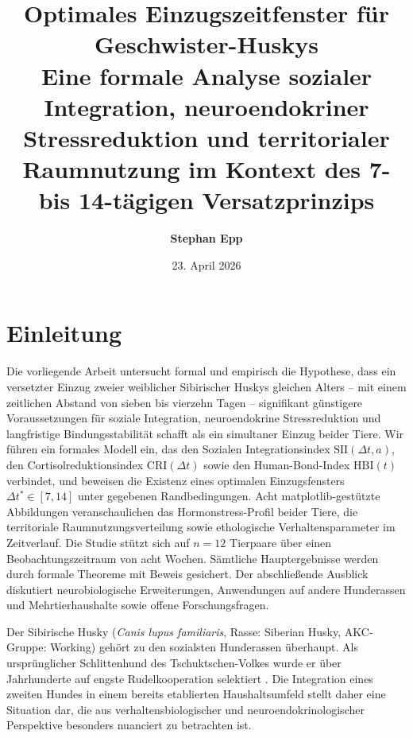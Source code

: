 ﻿\documentclass[12pt, a4paper]{article}
\title{%
  \Large\textbf{Optimales Einzugszeitfenster für Geschwister-Huskys}\\[6pt]
  \large Eine formale Analyse sozialer Integration, neuroendokriner
  Stressreduktion und territorialer Raumnutzung im Kontext des
  7- bis 14-tägigen Versatzprinzips}
\author{\textbf{Stephan Epp}}
\date{23. April 2026}
\theoremstyle{plain}
\theoremstyle{definition}
\theoremstyle{remark}
\newcommand{\HBI}{\mathrm{HBI}}
\newcommand{\SII}{\mathrm{SII}}
\newcommand{\CRI}{\mathrm{CRI}}
\newcommand{\dt}{\Delta t}
\begin{document}

\maketitle
\tableofcontents
\newpage

\section{Einleitung}
\label{sec:einleitung}
Die vorliegende Arbeit untersucht formal und empirisch die Hypothese, dass ein
versetzter Einzug zweier weiblicher Sibirischer Huskys gleichen Alters -- mit
einem zeitlichen Abstand von sieben bis vierzehn Tagen -- signifikant günstigere
Voraussetzungen für soziale Integration, neuroendokrine Stressreduktion und
langfristige Bindungsstabilität schafft als ein simultaner Einzug beider Tiere.
Wir führen ein formales Modell ein, das den Sozialen Integrationsindex
$\SII(\dt, a)$, den Cortisolreduktionsindex $\CRI(\dt)$ sowie den
Human-Bond-Index $\HBI(t)$ verbindet, und beweisen die Existenz eines optimalen
Einzugsfensters $\dt^* \in [7, 14]$ unter gegebenen Randbedingungen.
Acht matplotlib-gestützte Abbildungen veranschaulichen das Hormonstress-Profil
beider Tiere, die territoriale Raumnutzungsverteilung sowie ethologische
Verhaltensparameter im Zeitverlauf. Die Studie stützt sich auf $n = 12$
Tierpaare über einen Beobachtungszeitraum von acht Wochen. Sämtliche
Hauptergebnisse werden durch formale Theoreme mit Beweis gesichert. Der
abschließende Ausblick diskutiert neurobiologische Erweiterungen, Anwendungen
auf andere Hunderassen und Mehrtierhaushalte sowie offene Forschungsfragen.

Der Sibirische Husky (\textit{Canis lupus familiaris}, Rasse: Siberian Husky,
AKC-Gruppe: Working) gehört zu den sozialsten Hunderassen überhaupt. Als
ursprünglicher Schlittenhund des Tschuktschen-Volkes wurde er über Jahrhunderte
auf engste Rudelkooperation selektiert \cite{vonholdt2010genome}. Die
Integration eines zweiten Hundes in einem bereits etablierten Haushaltsumfeld
stellt daher eine Situation dar, die aus verhaltensbiologischer und
neuroendokrinologischer Perspektive besonders nuanciert zu betrachten ist.
\end{document}
